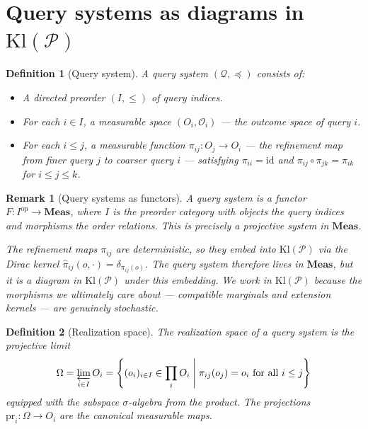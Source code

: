 \documentclass[11pt]{article}
\newtheorem{definition}{Definition}
\newtheorem{remark}{Remark}
\newcommand{\Meas}{\mathbf{Meas}}
\newcommand{\Kl}{\mathrm{Kl}}
\newcommand{\Pcal}{\mathcal{P}}
\newcommand{\Qcal}{\mathcal{Q}}
\newcommand{\Ocal}{\mathcal{O}}
\newcommand{\id}{\mathrm{id}}
\newcommand{\op}{\mathrm{op}}
\newcommand{\pr}{\mathrm{pr}}
\newcommand{\varlim}{\varprojlim}
\begin{document}
\section{Query systems as diagrams in $\Kl(\Pcal)$}
\label{sec:query-system}

\begin{definition}[Query system]\label{def:query-system}
A \emph{query system} $(\Qcal, \preceq)$ consists of:
\begin{itemize}
  \item A directed preorder $(I, \leq)$ of \emph{query indices}.
  \item For each $i \in I$, a measurable space $(O_i, \Ocal_i)$ --- the
    \emph{outcome space} of query $i$.
  \item For each $i \leq j$, a measurable function $\pi_{ij} : O_j \to O_i$
    --- the \emph{refinement map} from finer query $j$ to coarser query $i$
    --- satisfying $\pi_{ii} = \id$ and $\pi_{ij} \circ \pi_{jk} = \pi_{ik}$
    for $i \leq j \leq k$.
\end{itemize}
\end{definition}

\begin{remark}[Query systems as functors]
A query system is a functor $F : I^\op \to \Meas$, where $I$ is the preorder
category with objects the query indices and morphisms the order relations.
This is precisely a \emph{projective system} in $\Meas$.

The refinement maps $\pi_{ij}$ are deterministic, so they embed into
$\Kl(\Pcal)$ via the Dirac kernel $\hat\pi_{ij}(o, \cdot) = \delta_{\pi_{ij}(o)}$.
The query system therefore lives in $\Meas$, but it is a diagram in $\Kl(\Pcal)$
under this embedding.  We work in $\Kl(\Pcal)$ because the morphisms we
ultimately care about --- compatible marginals and extension kernels --- are
genuinely stochastic.
\end{remark}

\begin{definition}[Realization space]
The \emph{realization space} of a query system is the projective limit
\[
  \Omega = \varlim_{i \in I} O_i
  = \left\{ (o_i)_{i \in I} \in \prod_i O_i \;\middle|\;
    \pi_{ij}(o_j) = o_i \text{ for all } i \leq j \right\}
\]
equipped with the subspace $\sigma$-algebra from the product.  The projections
$\pr_i : \Omega \to O_i$ are the canonical measurable maps.
\end{definition}
\end{document}
